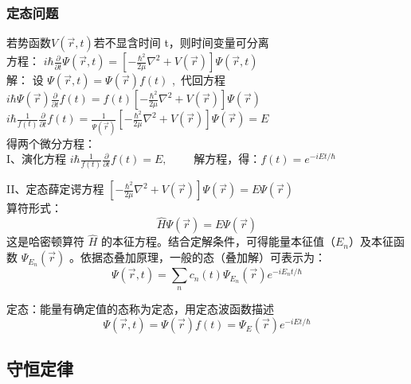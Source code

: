 \begin{frame} 
    \frametitle{定态问题}
    若势函数$V(\vec{r},t ) $若不显含时间 t，则时间变量可分离 \\ \vspace{0.3cm}
    方程： { $ \displaystyle i \hbar \frac{\partial }{\partial t} \Psi (\vec{r},t ) =\left [- \frac{\hbar^2}{2\mu }\nabla ^2 + V(\vec{r}) \right ]\Psi (\vec{r},t ) $}  \\  \vspace{0.3cm}
    \alert{解：}  设  $\Psi (\vec{r},t )  = \Psi (\vec{r} ) f(t) $ , 代回方程 \\ 
     { $ \displaystyle i\hbar \Psi (\vec{r})  \frac{\partial }{\partial t} f(t)=f(t) \left [ -\frac{\hbar^2}{2\mu }\nabla ^2 + V(\vec{r}) \right ]\Psi (\vec{r}) $}  \\ 	
     { $ \displaystyle i\hbar \frac{1}{f(t)}  \frac{\partial }{\partial t} f(t)= \frac{1}{\Psi (\vec{r}) } \left [ -\frac{\hbar^2}{2\mu }\nabla ^2 + V(\vec{r}) \right ]\Psi (\vec{r}) =E $}  \\ \vspace{0.3cm} 
     得两个微分方程：\\  \vspace{0.3cm}
     I、演化方程  $ \displaystyle  i\hbar \frac{1}{f(t)}  \frac{\partial }{\partial t} f(t)=E, \qquad $  
        解方程，得：$\displaystyle  f(t) =e^{-iEt/\hbar}$ 
\end{frame}

\begin{frame} 
    II、定态薛定谔方程 $\displaystyle   \left [ -\frac{\hbar^2}{2\mu }\nabla ^2 + V(\vec{r}) \right ]\Psi (\vec{r}) =E \Psi (\vec{r})  $   \\ 
    算符形式：$$\displaystyle   \hat{H} \Psi (\vec{r}) =E \Psi (\vec{r})  $$   
    这是哈密顿算符 $\hat{H}$ 的本征方程。结合定解条件，可得能量本征值（$E_n$）及本征函数 $\Psi_{E_n} (\vec{r} )$ 。依据态叠加原理，一般的态（叠加解）可表示为：
    \[ \Psi (\vec{r},t ) =\sum\limits_n c_n(t)\Psi_{E_n} (\vec{r} ) e^{-iE_n t/\hbar}  \]
    \begin{definition}
        定态：能量有确定值的态称为定态，用定态波函数描述
        \[ \Psi (\vec{r},t )  = \Psi (\vec{r} ) f(t) = \Psi_E (\vec{r} ) e^{-iEt/\hbar} \] 
    \end{definition}
\end{frame}

\subsection{守恒定律}

